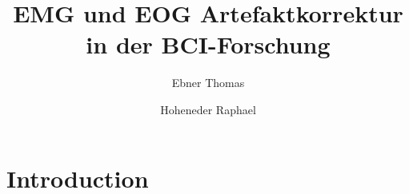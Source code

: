 \documentclass[preprint,12pt]{elsarticle}
\begin{document}
\begin{frontmatter}



\title{EMG und EOG Artefaktkorrektur in der BCI-Forschung}


\author{Ebner Thomas}
\author{Hoheneder Raphael}
\address{Graz University of Technology, Austria}

\begin{abstract}

\end{abstract}

\begin{keyword}


\end{keyword}

\end{frontmatter}


\section{Introduction}
\label{Introduction}
\end{document}

